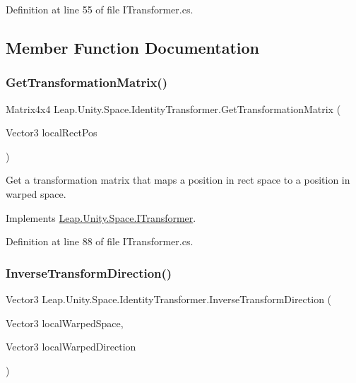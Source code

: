 Definition at line 55 of file I\+Transformer.\+cs.



\subsection{Member Function Documentation}
\mbox{\label{class_leap_1_1_unity_1_1_space_1_1_identity_transformer_a693ed0cac442e346b6bad9e1a5dc92a1}} 
\subsubsection{\texorpdfstring{GetTransformationMatrix()}{GetTransformationMatrix()}}
{\footnotesize\ttfamily Matrix4x4 Leap.\+Unity.\+Space.\+Identity\+Transformer.\+Get\+Transformation\+Matrix (\begin{DoxyParamCaption}\item[{Vector3}]{local\+Rect\+Pos }\end{DoxyParamCaption})}



Get a transformation matrix that maps a position in rect space to a position in warped space. 



Implements \mbox{\hyperlink{interface_leap_1_1_unity_1_1_space_1_1_i_transformer_a151be0f514da2568b75177fdb31724b3}{Leap.\+Unity.\+Space.\+I\+Transformer}}.



Definition at line 88 of file I\+Transformer.\+cs.

\mbox{\label{class_leap_1_1_unity_1_1_space_1_1_identity_transformer_a793967a882ba3156bf728ca4ad8afd26}} 
\subsubsection{\texorpdfstring{InverseTransformDirection()}{InverseTransformDirection()}}
{\footnotesize\ttfamily Vector3 Leap.\+Unity.\+Space.\+Identity\+Transformer.\+Inverse\+Transform\+Direction (\begin{DoxyParamCaption}\item[{Vector3}]{local\+Warped\+Space,  }\item[{Vector3}]{local\+Warped\+Direction }\end{DoxyParamCaption})}



